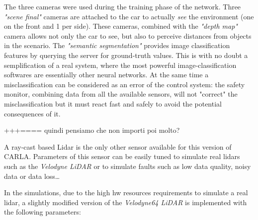 The three cameras were used during the training phase of the network. Three \textsl{"scene final"} cameras are attached to the car to actually \textsl{see} the environment (one on the front and 1 per side). These cameras, combined with the \textsl{"depth map"} camera allows not only the car to see, but also to perceive distances from objects in the scenario.
The \textsl{"semantic segmentation"} provides image classification features by querying the server for ground-truth values. This is with no doubt a semplification of a real system, where the most powerful image-classification softwares are essentially other neural networks. At the same time a misclassification can be considered as an error of the control system: the safety monitor, combining data from all the available sensors, will not "correct" the misclassification but it must react fast and safely to avoid the potential consequences of it.\newline

+++====    quindi pensiamo che non importi poi molto?\newline

A ray-cast based Lidar is the only other sensor available for this version of CARLA. Parameters of this sensor can be easily tuned to simulate real lidars such as the \textsl{Velodyne LiDAR} or to simulate faults such as low data quality, noisy data or data loss\dots

In the simulations, due to the high hw resources requirements to simulate a real lidar, a slightly modified version of the \textsl{Velodyne64 LiDAR} is implemented with the following parameters:

